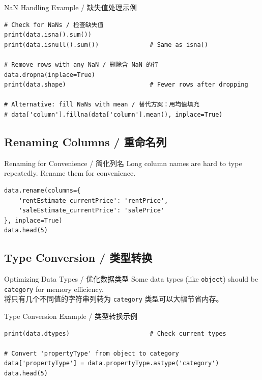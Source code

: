 \documentclass[11pt,a4paper]{report}
\let\oldtexttt\texttt
\renewcommand{\texttt}[1]{\textcolor{mainblue}{\oldtexttt{#1}}}
\begin{document}
\begin{examplebox}{NaN Handling Example / 缺失值处理示例}
\begin{lstlisting}
# Check for NaNs / 检查缺失值
print(data.isna().sum())
print(data.isnull().sum())              # Same as isna()

# Remove rows with any NaN / 删除含 NaN 的行
data.dropna(inplace=True)
print(data.shape)                       # Fewer rows after dropping

# Alternative: fill NaNs with mean / 替代方案：用均值填充
# data['column'].fillna(data['column'].mean(), inplace=True)
\end{lstlisting}
\end{examplebox}

\subsection{Renaming Columns / 重命名列}

\begin{examplebox}{Renaming for Convenience / 简化列名}
    Long column names are hard to type repeatedly. Rename them for convenience.
\begin{lstlisting}
data.rename(columns={
    'rentEstimate_currentPrice': 'rentPrice',
    'saleEstimate_currentPrice': 'salePrice'
}, inplace=True)
data.head(5)
\end{lstlisting}
\end{examplebox}

\subsection{Type Conversion / 类型转换}

\begin{concept}{Optimizing Data Types / 优化数据类型}
    Some data types (like \texttt{object}) should be \texttt{category} for memory efficiency. \\
    将只有几个不同值的字符串列转为 \texttt{category} 类型可以大幅节省内存。
\end{concept}

\begin{examplebox}{Type Conversion Example / 类型转换示例}
\begin{lstlisting}
print(data.dtypes)                      # Check current types

# Convert 'propertyType' from object to category
data['propertyType'] = data.propertyType.astype('category')
data.head(5)
\end{lstlisting}
\end{examplebox}
\end{document}
